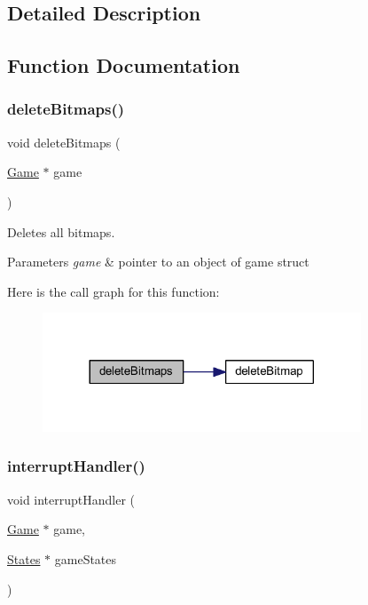\subsection{Detailed Description}


\subsection{Function Documentation}
\mbox{\label{group___game_gac69172228ce6b7881580536187b0ce82}} 
\subsubsection{\texorpdfstring{delete\+Bitmaps()}{deleteBitmaps()}}
{\footnotesize\ttfamily void delete\+Bitmaps (\begin{DoxyParamCaption}\item[{\hyperlink{struct_game}{Game} $\ast$}]{game }\end{DoxyParamCaption})}



Deletes all bitmaps. 


\begin{DoxyParams}{Parameters}
{\em game} & pointer to an object of game struct \\
\hline
\end{DoxyParams}
Here is the call graph for this function\+:
\nopagebreak
\begin{figure}[H]
\begin{center}
\leavevmode
\includegraphics[width=269pt]{group___game_gac69172228ce6b7881580536187b0ce82_cgraph}
\end{center}
\end{figure}
\mbox{\label{group___game_ga5f4dcc9f4534fe0b6c73f105705434f8}} 
\subsubsection{\texorpdfstring{interrupt\+Handler()}{interruptHandler()}}
{\footnotesize\ttfamily void interrupt\+Handler (\begin{DoxyParamCaption}\item[{\hyperlink{struct_game}{Game} $\ast$}]{game,  }\item[{\hyperlink{struct_states}{States} $\ast$}]{game\+States }\end{DoxyParamCaption})}



